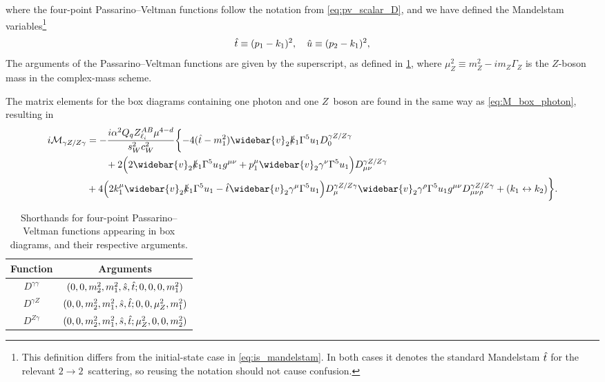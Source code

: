 where the four-point Passarino--Veltman functions follow the notation from \cref{eq:pv_scalar_D}, and we have defined the Mandelstam variables\footnote{This definition differs from the initial-state case in \cref{eq:is_mandelstam}. In both cases it denotes the standard Mandelstam $\hat{t}$ for the relevant $2\to2$~scattering, so reusing the notation should not cause confusion.}
\begin{equation}
    \hat{t} \equiv (p_1-k_1)^2, \quad \hat{u} \equiv (p_2-k_1)^2,
    \label{eq:box_mandelstam}
\end{equation}
The arguments of the Passarino--Veltman functions are given by the superscript, as defined in \cref{tab:D_arguments}, where $\mu_Z^2 \equiv m_Z^2-im_Z\Gamma_Z$ is the $Z$-boson mass in the complex-mass scheme.

The matrix elements for the box diagrams containing one photon and one $Z$~boson are found in the same way as \cref{eq:M_box_photon}, resulting in
\begin{equation}
\begin{split}
    i\M_{\gamma Z/Z\gamma} &= -\frac{i\alpha^2 Q_q \zliab \mu^{4-d}}{s_W^2c_W^2} \biggl\{
        - 4(\that-m_1^2) \widebar{v}_2\koneslash\Gamma^5 u_1 D^{\gamma Z/Z\gamma}_0
        \\ &\qquad
        + 2\Bigl(
            2\widebar{v}_2\koneslash\Gamma^5 u_1 g^{\mu\nu} + p_1^\mu \widebar{v}_2\gamma^\nu\Gamma^5 u_1
        \Bigr) D^{\gamma Z/Z\gamma}_{\mu\nu}
        \\
        &+ 4\Bigl(
            2k_1^\mu \widebar{v}_2 \koneslash\Gamma^5 u_1 - \that \widebar{v}_2 \gamma^\mu\Gamma^5 u_1
        \Bigr) D^{\gamma Z/Z\gamma}_\mu
        \widebar{v}_2\gamma^\rho\Gamma^5 u_1 g^{\mu\nu} D^{\gamma Z/Z\gamma}_{\mu\nu\rho}
        + (k_1 \leftrightarrow k_2)
    \biggr\}.
\end{split}
\label{eq:M_box_photon_Z}
\end{equation}

\begin{table}[t]
    \centering
    \caption{Shorthands for four-point Passarino--Veltman functions appearing in box diagrams, and their respective arguments.}
    \label{tab:D_arguments}
    \renewcommand{\arraystretch}{1.4}
    \begin{tabular}{|c|c|}
        \hline
        Function & Arguments
        \\\hline
        $D^{\gamma\gamma}$ & $(0,0,m_2^2,m_1^2,\hat{s},\hat{t}; 0,0,0,m_1^2)$
        \\
        $D^{\gamma Z}$ & $(0,0,m_2^2,m_1^2,\hat{s},\hat{t}; 0,0,\mu_Z^2,m_1^2)$
        \\
        $D^{Z\gamma}$ & $(0,0,m_2^2,m_1^2,\hat{s},\hat{t}; \mu_Z^2,0,0,m_2^2)$
        \\\hline
    \end{tabular}
\end{table}


